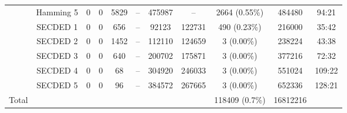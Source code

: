 \begin{table}[ht]
\begin{tabular}{@{}ccccccccccc@{}}
                                                           & Hamming 5     & 0     & 0            & 5829        & --          & \num{475987}                             & --                                      & 2664 {\tiny (0.55\%)}        & \num{484480}   & 94:21                           \\
                                                           & SECDED 1      & 0     & 0            & 656         & --          & \num{92123 }                             & \num{122731}                            & 490 {\tiny (0.23\%)}         & \num{216000}   & 35:42                           \\
                                                           & SECDED 2      & 0     & 0            & 1452        & --          & \num{112110}                             & \num{124659}                            & 3 {\tiny (0.00\%)}           & \num{238224}   & 43:38                           \\
                                                           & SECDED 3      & 0     & 0            & 640         & --          & \num{200702}                             & \num{175871}                            & 3 {\tiny (0.00\%)}           & \num{377216}   & 72:32                           \\
                                                           & SECDED 4      & 0     & 0            & 68          & --          & \num{304920}                             & \num{246033}                            & 3 {\tiny (0.00\%)}           & \num{551024}   & 109:22                          \\
                                                           & SECDED 5      & 0     & 0            & 96          & --          & \num{384572}                             & \num{267665}                            & 3 {\tiny (0.00\%)}           & \num{652336}   & 128:21                          \\\midrule
        Total                                              &               &       &              &             &             &                                          &                                         & \num{118409} {\tiny (0.7\%)} & \num{16812216} &                                 \\
        \bottomrule
    \end{tabular}
\end{table}

